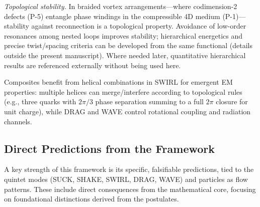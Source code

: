 \medskip
\noindent\textit{Topological stability.}
In braided vortex arrangements---where codimension-2 defects (P-5) entangle phase windings in the compressible 4D medium (P-1)---stability against reconnection is a topological property. Avoidance of low-order resonances among nested loops improves stability; hierarchical energetics and precise twist/spacing criteria can be developed from the same functional (details outside the present manuscript). Where needed later, quantitative hierarchical results are referenced externally \cite{Norris2025GoldenRatio} without being used here.

Composites benefit from helical combinations in SWIRL for emergent EM properties: multiple helices can merge/interfere according to topological rules (e.g., three quarks with $2\pi/3$ phase separation summing to a full $2\pi$ closure for unit charge), while DRAG and WAVE control rotational coupling and radiation channels.

\medskip
\noindent
{}
\medskip

\subsection{Direct Predictions from the Framework}

A key strength of this framework is its specific, falsifiable predictions, tied to the quintet modes (SUCK, SHAKE, SWIRL, DRAG, WAVE) and particles as flow patterns. These include direct consequences from the mathematical core, focusing on foundational distinctions derived from the postulates.

